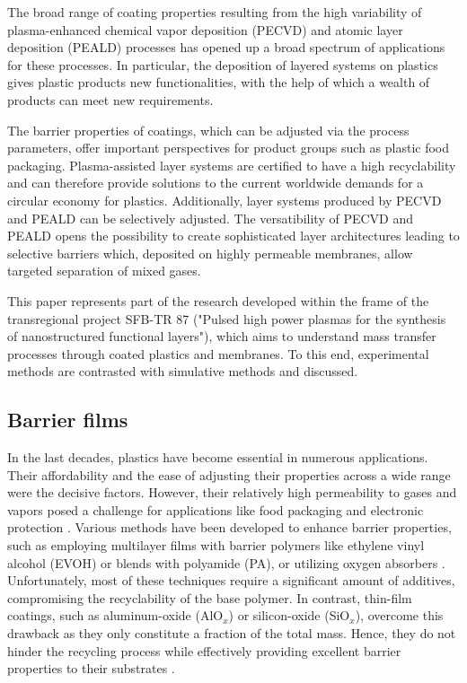 \documentclass[AMA,STIX2COL]{WileyNJD-v2} %
\newif\ifcomments
\begin{document}
\ifcomments
\else\fi

The broad range of coating properties resulting from the high variability of plasma-enhanced chemical vapor deposition (PECVD) and atomic layer deposition (PEALD) processes has opened up a broad spectrum of applications for these processes. In particular, the deposition of layered systems on plastics gives plastic products new functionalities, with the help of which a wealth of products can meet new requirements.

The barrier properties of coatings, which can be adjusted via the process parameters, offer important perspectives for product groups such as plastic food packaging. Plasma-assisted layer systems are certified to have a high recyclability and can therefore provide solutions to the current worldwide demands for a circular economy for plastics. Additionally, layer systems produced by PECVD and PEALD can be selectively adjusted. The versatibility of PECVD and PEALD opens the possibility to create sophisticated layer architectures leading to selective barriers which, deposited on highly permeable membranes, allow targeted separation of mixed gases.

This paper represents part of the research developed within the frame of the transregional project SFB-TR 87 ("Pulsed high power plasmas for the synthesis of nanostructured functional layers"), which aims to understand mass transfer processes through coated plastics and membranes. To this end, experimental methods are contrasted with simulative methods and discussed.

\subsection{Barrier films}\label{subsec11}

In the last decades, plastics have become essential in numerous applications. Their affordability and the ease of adjusting their properties across a wide range were the decisive factors. However, their relatively high permeability to gases and vapors posed a challenge for applications like food packaging and electronic protection \cite{GiacintiBaschetti.2020, LeFloch.2018}. Various methods have been developed to enhance barrier properties, such as employing multilayer films with barrier polymers like ethylene vinyl alcohol (EVOH) or blends with polyamide (PA), or utilizing oxygen absorbers \cite{McKeen.2017, Gaikwad.2018, Bauer.2021}. Unfortunately, most of these techniques require a significant amount of additives, compromising the recyclability of the base polymer. In contrast, thin-film coatings, such as aluminum-oxide (AlO$_x$) or silicon-oxide (SiO$_x$), overcome this drawback as they only constitute a fraction of the total mass. Hence, they do not hinder the recycling process while effectively providing excellent barrier properties to their substrates \cite{Bauer.2021, Wilski_2020}.
\end{document}
